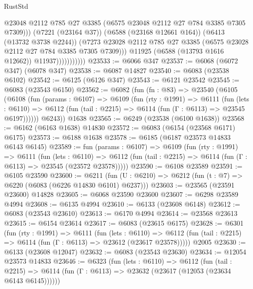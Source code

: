 \begin{lexlean}{RustStd}
\begin{coremodule}
                                @23048
                                @2112
                                @785
                                @27
                                @3385
                                (@6575 @23048 @2112 @27 @784 @3385 @7305 @7309)))
                            (@7221 (@23164 @37))
                            (@6588 (@23168 @12661 @164))
                            (@6413 (@13732 @3738 @2244))
                            (@7273
                              @23028
                              @2112
                              @785
                              @27
                              @3385
                              (@6575 @23028 @2112 @27 @784 @3385 @7305 @7309)))
                          @11925
                          (@6588 (@13793 @1616 @12662))
                          @11937)))))))))))
@23533 := @6066 @347
@23537 := @6068 (@6072 @347) (@6078 @347)
@23538 := @6087 @14827
@23540 := @6083 (@23538 @6102)
@23542 := @6125 (@6126 @347)
@23543 := @6121 @23542
@23545 := @6083 (@23543 @6150)
@23562 := @6082
    (fun (fn : @83) =>
    @23540
      (@6105
        (@6108
          (fun (params : @6107) =>
          @6109
            (fun (rty : @1991) =>
            @6111
              (fun (lets : @6110) =>
              @6112 (fun (tail : @2215) => @6114 (fun (Γ : @6113) => @23545 @6197))))))
        @6243))
    @1638
@23565 := @6249 (@23538 (@6100 @1638))
@23568 := @6162 (@6163 @1638) @14830
@23572 := @6083 (@6154 (@23568 @6171) @6175)
@23573 := @6188 @1638
@23578 := @6185 (@6187 @23573 @14833 @6143 @6145)
@23589 := fun (params : @6107) =>
  @6109
    (fun (rty : @1991) =>
    @6111
      (fun (lets : @6110) =>
      @6112 (fun (tail : @2215) => @6114 (fun (Γ : @6113) => @23545 (@23572 @23578)))))
@23590 := @6108 @23589
@23591 := @6105 @23590
@23600 := @6211
    (fun (U : @6210) => @6212 (fun (t : @7) => @6220 (@6083 (@6226 @14830 @6101) @6237)))
@23603 := @23565 (@23591 @23600) @14828
@23605 := @6068 @23590 @23600
@23607 := @6298 @23589 @4994
@23608 := @6135 @4994
@23610 := @6133 (@23608 @6148)
@23612 := @6083 (@23543 @23610)
@23613 := @6170 @4994
@23614 := @23568 @23613
@23615 := @6154 @23614
@23617 := @6083 (@23615 @6175)
@23628 := @6301
    (fun (rty : @1991) =>
    @6111
      (fun (lets : @6110) =>
      @6112 (fun (tail : @2215) => @6114 (fun (Γ : @6113) => @23612 (@23617 @23578)))))
    @2005
@23630 := @6133 (@23608 @12047)
@23632 := @6083 (@23543 @23630)
@23634 := @12054 @23573 @14833
@23646 := @6323
    (fun (lets : @6110) =>
    @6112
      (fun (tail : @2215) =>
      @6114 (fun (Γ : @6113) => @23632 (@23617 (@12053 (@23634 @6143 @6145))))))

\end{coremodule}
\end{lexlean}
